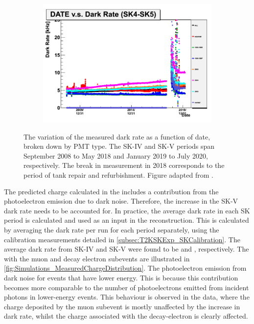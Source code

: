 \begin{figure}[h]
  \begin{subfigure}[t]{\textwidth}
    \includegraphics[width=\textwidth, trim={0mm 0mm 0mm 0mm}, clip, page=1]{Figures/Simulations/DarkRate.pdf}
  \end{subfigure}
  \caption{The variation of the measured dark rate as a function of date, broken down by PMT type. The SK-IV and SK-V periods span September 2008 to May 2018 and January 2019 to July 2020, respectively. The break in measurement in 2018 corresponds to the period of tank repair and refurbishment. Figure adapted from \cite{t2k_tn_399}.}
  \label{fig:Simulations_DarkRateVariation}
\end{figure}

The predicted charge calculated in the \fq {}  includes a contribution from the photoelectron emission due to dark noise. Therefore, the increase in the SK-V dark rate needs to be accounted for. In practice, the average dark rate in each SK period is calculated and used as an input in the reconstruction. This is calculated by averaging the dark rate per run for each period separately, using the calibration measurements detailed in \autoref{subsec:T2KSKExp_SKCalibration}. The average dark rate from SK-IV and SK-V were found to be  and , respectively. The   with the muon and decay electron subevents are illustrated in \autoref{fig:Simulations_MeasuredChargeDistribution}. The photoelectron emission from dark noise   for events that have lower energy. This is because this contribution becomes more comparable to the number of photoelectrons emitted from incident photons in lower-energy events. This behaviour is observed in the data, where the charge deposited by the muon subevent is mostly unaffected by the increase in dark rate, whilst the charge associated with the decay-electron is clearly affected.

